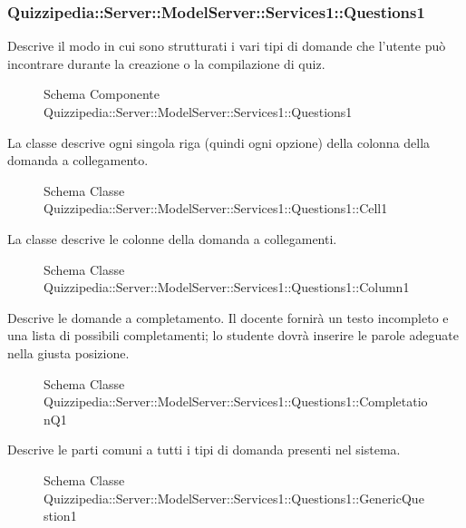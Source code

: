 \subsubsection{Quizzipedia::Server::ModelServer::Services1::Questions1}
Descrive il modo in cui sono strutturati i vari tipi di domande che l'utente può incontrare durante la creazione o la compilazione di quiz.
\begin{figure}[H]
\centering
\noindent{}
\caption{Schema Componente Quizzipedia::Server::ModelServer::Services1::Questions1}
\end{figure}
La classe descrive ogni singola riga (quindi ogni opzione) della colonna della domanda a collegamento.
\begin{figure}[H]
\centering
\noindent{}
\caption{Schema Classe Quizzipedia::Server::ModelServer::Services1::Questions1::Cell1}
\end{figure}
La classe descrive le colonne della domanda a collegamenti.
\begin{figure}[H]
\centering
\noindent{}
\caption{Schema Classe Quizzipedia::Server::ModelServer::Services1::Questions1::Column1}
\end{figure}
Descrive le domande a completamento. Il docente fornirà un testo incompleto e una lista di possibili completamenti; lo studente dovrà inserire le parole adeguate nella giusta posizione.
\begin{figure}[H]
\centering
\noindent{}
\caption{Schema Classe Quizzipedia::Server::ModelServer::Services1::Questions1::CompletationQ1}
\end{figure}
Descrive le parti comuni a tutti i tipi di domanda presenti nel sistema.
\begin{figure}[H]
\centering
\noindent{}
\caption{Schema Classe Quizzipedia::Server::ModelServer::Services1::Questions1::GenericQuestion1}
\end{figure}
